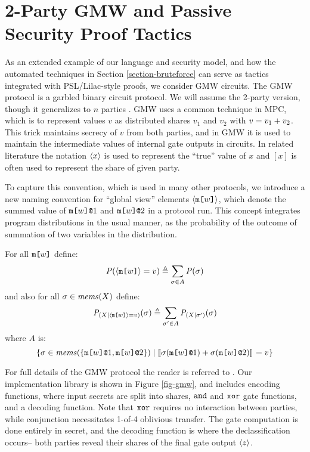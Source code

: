 \section{2-Party GMW and Passive Security Proof Tactics}
\label{section-metalang-gmw}
\label{section-example-gmw}



As an extended example of our language and security model, and how the
automated techniques in Section \ref{section-bruteforce} can serve
as tactics integrated with PSL/Lilac-style proofs, we consider GMW
circuits.  The GMW protocol is a garbled binary circuit protocol.  We
will assume the 2-party version, though it generalizes to $n$
parties \cite{goldreich2019play}. GMW uses a common technique in MPC, which is to
represent values $v$ as distributed shares $v_1$ and $v_2$ with $v =
v_1 + v_2$. This trick maintains secrecy of $v$ from both
parties, and in GMW it is used to maintain the intermediate values of
internal gate outputs in circuits. In related literature the notation
$\langle x \rangle$ is used to represent the ``true'' value of $x$ and $[x]$
is often used to represent the share of given party.

To capture this convention, which is used in many other protocols, we
introduce a new naming convention for ``global view'' elements
$\langle \texttt{m[}w\texttt{]} \rangle$, which denote the summed value of
$\texttt{m[}w\texttt{]}\texttt{@}1$ and $\texttt{m[}w\texttt{]}\texttt{@}2$ in a protocol
run. This concept integrates program distributions in the
usual manner, as the probability of the outcome of summation
of two variables in the distribution.
\begin{definition}
  For all $\texttt{m[}w\texttt{]}$ define:
  $$\mathit{P}(\langle \texttt{m[}w\texttt{]} \rangle = v) \triangleq \sum_{\sigma \in A} \mathit{P}(\sigma)$$
  and also for all $\sigma \in \mathit{mems}(X)$ define:
  $$\mathit{P}_{({X}|{\langle \texttt{m[}w\texttt{]} \rangle = v})}(\sigma) \triangleq  \sum_{\sigma' \in A} \mathit{P}_{({X}|{\sigma'})}(\sigma)$$
  where $A$ is:
  $$\{ \sigma \in \mathit{mems}(\{ \texttt{m[}w\texttt{]}\texttt{@}1,\texttt{m[}w\texttt{]}\texttt{@}2 \} ) \mid
      \llbracket \sigma(\texttt{m[}w\texttt{]}\texttt{@}1) + \sigma(\texttt{m[}w\texttt{]}\texttt{@}2) \rrbracket_{} = v \}$$
\end{definition}

For full details of the GMW protocol the reader is referred to
\cite{evans2018pragmatic}. Our implementation library is shown in
Figure \ref{fig-gmw}, and includes encoding functions, where
input secrets are split into shares, $\texttt{and}$ and $\texttt{xor}$ gate
functions, and a decoding function. Note that $\texttt{xor}$ requires
no interaction between parties, while conjunction necessitates
1-of-4 oblivious transfer. The gate computation is
done entirely in secret, and the decoding function
is where the declassification occurs-- both parties reveal
their shares of the final gate output $\langle z \rangle$.


